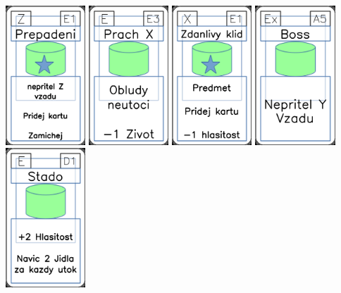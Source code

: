 \documentclass[a4paper]{article}
\begin{document}
	\includegraphics[width=3.0cm]{img-5_50}
	\includegraphics[width=3.0cm]{img-4_52}
	\includegraphics[width=3.0cm]{img-5_20}
	\includegraphics[width=3.0cm]{img-4_4}
	\includegraphics[width=3.0cm]{img-4_45}
\end{document}
